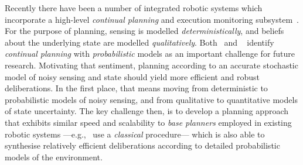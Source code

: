 
















Recently there have been a number of integrated robotic systems which
incorporate a high-level {\em continual planning} and execution
monitoring
subsystem~\cite{wyattetal2010tamd,talamadupula:2010,Kraft2008}.
For the purpose of planning, sensing is modelled {\em
deterministically}, and beliefs about the underlying state are
modelled {\em qualitatively}.
Both~\citeauthor{talamadupula:2010} and
~\citeauthor{wyattetal2010tamd} identify
\emph{continual planning} with {\em probabilistic}
models as an important challenge for future research.
Motivating that sentiment, planning according to an accurate
stochastic model of noisy sensing and state should yield more
efficient and robust deliberations.
In the first place, that means moving from deterministic to
probabilistic models of noisy sensing, and from qualitative to
quantitative models of state uncertainty. The key challenge then, is
to develop a planning approach that exhibits similar speed and
scalability to {\em base planners} employed in existing robotic
systems ---e.g.,~\citeauthor{wyattetal2010tamd} use a {\em classical}
procedure--- which is also able to synthesise relatively efficient
deliberations according to detailed probabilistic models of the
environment.









